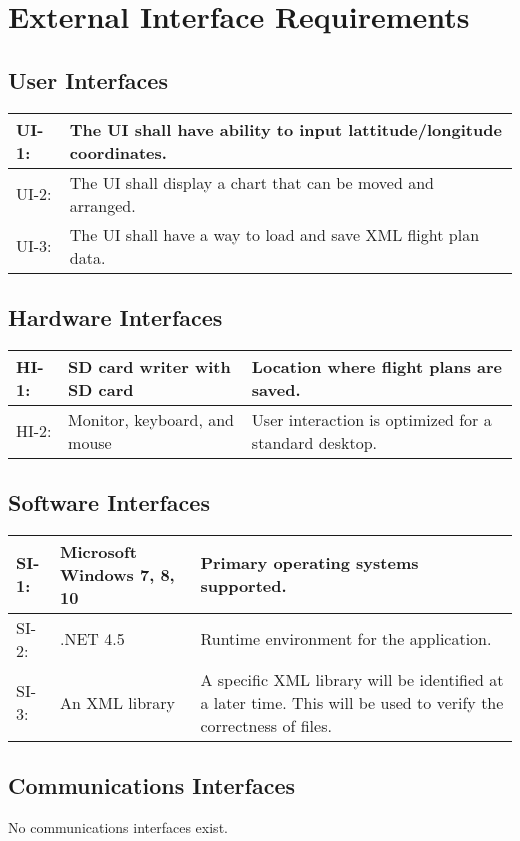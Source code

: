\documentclass[12pt, letterpaper]{article}
\begin{document}
\section{External Interface Requirements}
  \subsection{User Interfaces}
    \begin{tabularx}{\textwidth}{|l|X|} \hline
      UI-1: & The UI shall have ability to input lattitude/longitude coordinates. \\ \hline
      UI-2: & The UI shall display a chart that can be moved and arranged. \\ \hline
      UI-3: & The UI shall have a way to load and save XML flight plan data. \\ \hline
    \end{tabularx}
  \subsection{Hardware Interfaces}
    \begin{tabularx}{\textwidth}{|l|l|X|} \hline
      HI-1: & SD card writer with SD card & Location where flight plans are saved. \\ \hline
      HI-2: & Monitor, keyboard, and mouse & User interaction is optimized for a standard desktop. \\ \hline
    \end{tabularx}

  \subsection{Software Interfaces}
    \begin{tabularx}{\textwidth}{|l|l|X|} \hline
      SI-1: & Microsoft Windows 7, 8, 10 & Primary operating systems supported. \\ \hline
      SI-2: & .NET 4.5 & Runtime environment for the application. \\ \hline
      SI-3: & An XML library & A specific XML library will be identified at a later time.
        This will be used to verify the correctness of files. \\ \hline
    \end{tabularx}

  \subsection{Communications Interfaces}
  No communications interfaces exist.
\end{document}

